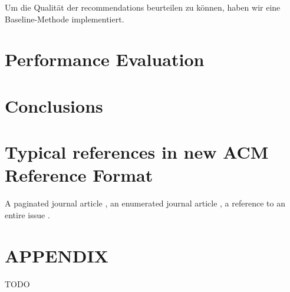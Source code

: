 \documentclass[prodmode,acmtecs]{acmsmall} %
\begin{document}
Um die Qualität der recommendations beurteilen zu können, haben wir eine Baseline-Methode implementiert.

\section{Performance Evaluation}

\section{Conclusions}



\section{Typical references in new ACM Reference Format}
A paginated journal article \cite{Abril07}, an enumerated
journal article \cite{Cohen07}, a reference to an entire issue \cite{JCohen96}.

\appendix
\section*{APPENDIX}
\setcounter{section}{1}
TODO





\medskip
\end{document}
